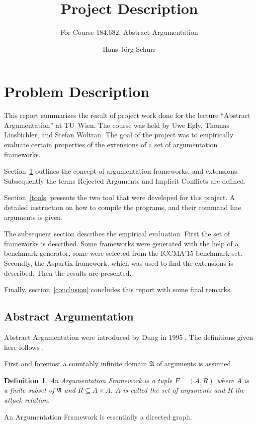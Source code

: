 \documentclass[parskip=half]{scrartcl}
\title{Project Description}
\subtitle{For Course 184.682: Abstract Argumentation}
\author{Hans-Jörg Schurr}
\newtheorem{definition}{Definition}
\begin{document}
\maketitle
\tableofcontents

\section{Problem Description}
\label{problemdesc}
This report summarizes the result of project work done for the lecture
``Abstract Argumentation'' at TU~Wien. The course was held by Uwe Egly,
Thomas Linsbichler, and Stefan Woltran.
The goal of the project
was to empirically evaluate certain properties of the extensions of a set of
argumentation frameworks.

Section~\ref{problemdesc} outlines the concept of argumentation frameworks, and
extensions. Subsequently the terms Rejected Arguments and Implicit Conflicts are
defined.

Section~\ref{tools} presents the two tool that were developed for this project.
A detailed instruction on how to compile the programs, and their command line
arguments is given.

The subsequent section describes the empirical evaluation. First the set of
frameworks is described.  Some frameworks were generated with the help of a
benchmark generator, some were selected from the ICCMA'15 benchmark set.
Secondly, the Aspartix framework, which was used to find the extensions is
described. Then the results are presented.

Finally, section~\ref{conclusion} concludes this report with some final remarks.

\subsection{Abstract Argumentation}
\label{aadef}
Abstract Argumentation were introduced by Dung in 1995 \cite{dung1995}. The
definitions given here follows \cite{linsbichler2015hidden}.

First and foremost a countably infinite domain $\mathfrak{A}$ of arguments
is assumed.

\begin{definition}
An \emph{Argumentation Framework}
is a tuple $F = (A,R)$ where $A$ is a finite subset of $\mathfrak{A}$
and $R \subseteq A\times A$.  $A$ is called the set of arguments and $R$ the
attack relation.
\end{definition}
An Argumentation Framework is essentially a directed graph.
\end{document}
